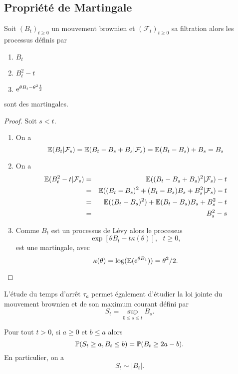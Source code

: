 \subsection{Propriété de Martingale}
\begin{prop}
Soit $(B_t)_{t\geq0}$ un mouvement brownien et $(\mathcal{F}_t)_{t\geq0}$ sa filtration alors les processus définis par 
\begin{enumerate}
  \item $B_t$
  \item $B_t^2-t$
  \item $\mathrm{e}^{\theta B_t - \theta^2\frac{t}{2}}$
\end{enumerate}
sont des martingales.
\end{prop}
\begin{proof}
Soit $s<t$. 
\begin{enumerate}
  \item On a 
  $$
  \mathbb{E}(B_t|\mathcal{F}_s) = \mathbb{E}(B_t- B_s + B_s|\mathcal{F}_s) = \mathbb{E}(B_t - B_s)+ B_s = B_s
  $$
  \item On a 
  \begin{eqnarray*}
  \mathbb{E}(B_t^2 - t|\mathcal{F}_s)&=& \mathbb{E}((B_t-B_s + B_s)^2 |\mathcal{F}_s) - t\\
  &=& \mathbb{E}((B_t-B_s)^2 +(B_t - B_s)B_s + B_s^2 |\mathcal{F}_s) - t\\
  &=& \mathbb{E}((B_t-B_s)^2) +\mathbb{E}(B_t - B_s)B_s  + B_s^2 - t\\
  &=& B_s^2 - s
  \end{eqnarray*}
  \item Comme $B_t$ est un processus de Lévy alors le processus 
  $$
  \exp\left[\theta B_t - t\kappa(\theta)\right],\text{ }t\geq 0,
  $$
  est une martingale, avec
  $$
\kappa(\theta) = \log(\mathbb{E}(\mathrm{e}^{\theta B_1})) = \theta^2 / 2.
  $$
\end{enumerate}
\end{proof}
L'étude du temps d'arrêt $\tau_a$ permet également d'étudier la loi jointe du mouvement brownien et de son maximum courant défini par 
$$
S_t = \sup_{0\leq s\leq t}B_s.
$$
\begin{prop}
Pour tout $t>0$, si $a\geq 0$ et $b\leq a$ alors
$$
\mathbb{P}(S_t \geq a,B_t \leq  b) = \mathbb{P}(B_t\geq 2a-b).
$$
En particulier, on a 
$$
S_t\sim |B_t|.
$$
\end{prop}
